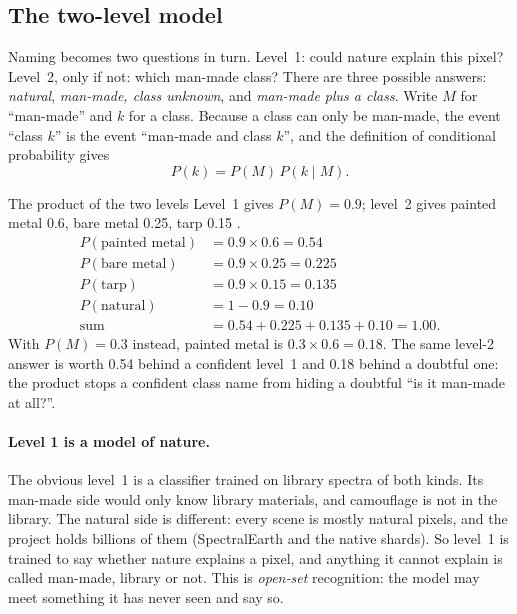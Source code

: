 \subsection{The two-level model}

Naming becomes two questions in turn. Level~1: could nature explain this pixel? Level~2, only if not: which
man-made class? There are three possible answers: \emph{natural}, \emph{man-made, class unknown}, and \emph{man-made
plus a class}. Write $M$ for ``man-made'' and $k$ for a class. Because a class can only be man-made, the event
``class $k$'' is the event ``man-made and class $k$'', and the definition of conditional probability gives
\begin{equation}
P(k)=P(M)\,P(k\mid M).
\label{eq:material:twolevel}
\end{equation}

\begin{worked}[label={we:material:twolevel}]{The product of the two levels}
Level~1 gives $P(M)=0.9$; level~2 gives painted metal 0.6, bare metal 0.25, tarp 0.15 \tagA.
\begin{align*}
P(\text{painted metal}) &= 0.9\times0.6 = 0.54\\
P(\text{bare metal}) &= 0.9\times0.25 = 0.225\\
P(\text{tarp}) &= 0.9\times0.15 = 0.135\\
P(\text{natural}) &= 1-0.9 = 0.10\\
\text{sum} &= 0.54+0.225+0.135+0.10 = 1.00 .
\end{align*}
With $P(M)=0.3$ instead, painted metal is $0.3\times0.6=0.18$. The same level-2 answer is worth 0.54 behind a
confident level~1 and 0.18 behind a doubtful one: the product stops a confident class name from hiding a doubtful
``is it man-made at all?''.
\end{worked}

\paragraph{Level 1 is a model of nature.} The obvious level~1 is a classifier trained on library spectra of both
kinds. Its man-made side would only know library materials, and camouflage is not in the library. The natural side
is different: every scene is mostly natural pixels, and the project holds billions of them (SpectralEarth and the
native shards). So level~1 is trained to say whether nature explains a pixel, and anything it cannot explain is
called man-made, library or not. This is \emph{open-set} recognition: the model may meet
something it has never seen and say so.

